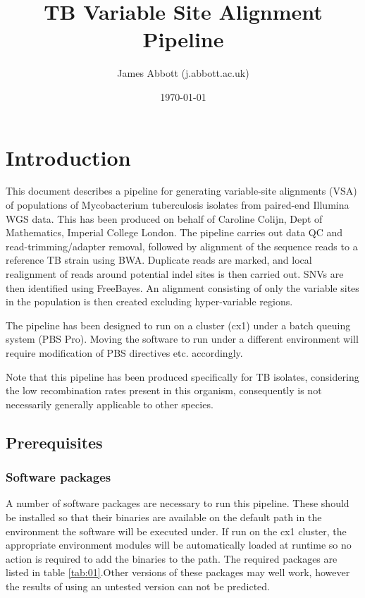 \documentclass[a4paper,10pt,twoside]{article}
\title{TB Variable Site Alignment Pipeline}
\date{\today}
\author{James Abbott (j.abbott\@imperial.ac.uk)}
\begin{document}
\maketitle
\thispagestyle{fancy} %

\tableofcontents

\section{Introduction}

This document describes a pipeline for generating variable-site alignments
(VSA) of populations of Mycobacterium tuberculosis isolates from paired-end
Illumina WGS data. This has been produced on behalf of Caroline Colijn, Dept of
Mathematics, Imperial College London. The pipeline carries out data QC and
read-trimming/adapter removal, followed by alignment of the sequence reads to a
reference TB strain using BWA.  Duplicate reads are marked, and local
realignment of reads around potential indel sites is then carried out. SNVs are
then identified using FreeBayes. An alignment consisting of only the variable
sites in the population is then created excluding hyper-variable regions.

The pipeline has been designed to run on a cluster (cx1) under a batch queuing
system (PBS Pro). Moving the software to run under a different environment will
require modification of PBS directives etc. accordingly.

Note that this pipeline has been produced specifically for TB isolates,
considering the low recombination rates present in this organism, consequently
is not necessarily generally applicable to other species.

\subsection{Prerequisites}

\subsubsection{Software packages}

A number of software packages are necessary to run this pipeline. These should
be installed so that their binaries are available on the default path in the
environment the software will be executed under. If run on the cx1 cluster, the
appropriate environment modules will be automatically loaded at runtime so no
action is required to add the binaries to the path. The required packages are
listed in table \ref{tab:01}.Other versions of these packages may well work,
however the results of using an untested version can not be predicted.
\end{document}
